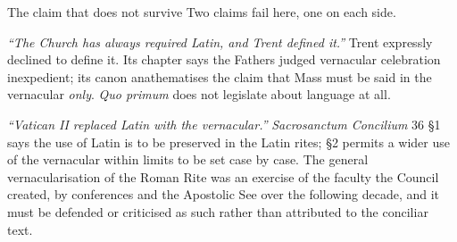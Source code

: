 \begin{studybox}{The claim that does not survive}
Two claims fail here, one on each side.

\emph{``The Church has always required Latin, and Trent defined it.''} Trent expressly declined to define it. Its chapter says the Fathers judged vernacular celebration inexpedient; its canon anathematises the claim that Mass must be said in the vernacular \emph{only}. \emph{Quo primum} does not legislate about language at all.

\emph{``Vatican II replaced Latin with the vernacular.''} \emph{Sacrosanctum Concilium} 36 \S 1 says the use of Latin is to be preserved in the Latin rites; \S 2 permits a wider use of the vernacular within limits to be set case by case. The general vernacularisation of the Roman Rite was an exercise of the faculty the Council created, by conferences and the Apostolic See over the following decade, and it must be defended or criticised as such rather than attributed to the conciliar text.
\end{studybox}
